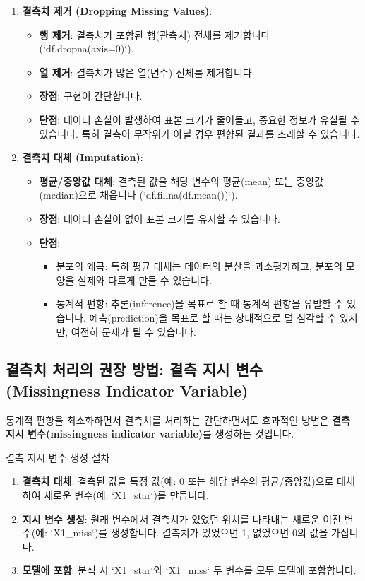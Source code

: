 \documentclass[11pt,a4paper]{article}
\begin{document}
\begin{enumerate}
    \item \textbf{결측치 제거 (Dropping Missing Values)}:
    \begin{itemize}
        \item \textbf{행 제거}: 결측치가 포함된 행(관측치) 전체를 제거합니다 (`df.dropna(axis=0)`).
        \item \textbf{열 제거}: 결측치가 많은 열(변수) 전체를 제거합니다.
        \item \textbf{장점}: 구현이 간단합니다.
        \item \textbf{단점}: 데이터 손실이 발생하여 표본 크기가 줄어들고, 중요한 정보가 유실될 수 있습니다. 특히 결측이 무작위가 아닐 경우 편향된 결과를 초래할 수 있습니다.
    \end{itemize}
    \item \textbf{결측치 대체 (Imputation)}:
    \begin{itemize}
        \item \textbf{평균/중앙값 대체}: 결측된 값을 해당 변수의 평균(mean) 또는 중앙값(median)으로 채웁니다 (`df.fillna(df.mean())`).
        \item \textbf{장점}: 데이터 손실이 없어 표본 크기를 유지할 수 있습니다.
        \item \textbf{단점}:
        \begin{itemize}
            \item 분포의 왜곡: 특히 평균 대체는 데이터의 분산을 과소평가하고, 분포의 모양을 실제와 다르게 만들 수 있습니다.
            \item 통계적 편향: 추론(inference)을 목표로 할 때 통계적 편향을 유발할 수 있습니다. 예측(prediction)을 목표로 할 때는 상대적으로 덜 심각할 수 있지만, 여전히 문제가 될 수 있습니다.
        \end{itemize}
    \end{itemize}
\end{enumerate}

\subsection*{결측치 처리의 권장 방법: 결측 지시 변수 (Missingness Indicator Variable)}
통계적 편향을 최소화하면서 결측치를 처리하는 간단하면서도 효과적인 방법은 \textbf{결측 지시 변수(missingness indicator variable)}를 생성하는 것입니다.

\begin{mybox}{결측 지시 변수 생성 절차}
\begin{enumerate}
    \item \textbf{결측치 대체}: 결측된 값을 특정 값(예: 0 또는 해당 변수의 평균/중앙값)으로 대체하여 새로운 변수(예: `X1_star`)를 만듭니다.
    \item \textbf{지시 변수 생성}: 원래 변수에서 결측치가 있었던 위치를 나타내는 새로운 이진 변수(예: `X1_miss`)를 생성합니다. 결측치가 있었으면 1, 없었으면 0의 값을 가집니다.
    \item \textbf{모델에 포함}: 분석 시 `X1_star`와 `X1_miss` 두 변수를 모두 모델에 포함합니다.
\end{enumerate}
\end{mybox}
\end{document}
